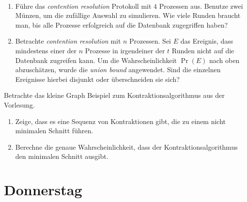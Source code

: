 \documentclass{uebung_cs}
\begin{document}
\begin{aufgabe}\
	\begin{enumerate}
		\item 
		Führe das \textit{contention resolution} Protokoll mit $4$ Prozessen aus. Benutze zwei Münzen, um die zufällige Auswahl zu simulieren. Wie viele Runden braucht man, bis alle Prozesse erfolgreich auf die Datenbank zugegriffen haben?
		\item Betrachte \textit{contention resolution} mit $n$ Prozessen. Sei $E$ das Ereignis, dass mindestens einer der $n$ Prozesse in irgendeiner der $t$ Runden nicht auf die Datenbank zugreifen kann.
		Um die Wahrscheinlichkeit $\Pr(E)$ nach oben abzuschätzen, wurde die \textit{union bound} angewendet. Sind die einzelnen Ereignisse hierbei disjunkt oder überschneiden sie sich?
	\end{enumerate}
\end{aufgabe}    

\begin{aufgabe}[Minimaler Schnitt]
	Betrachte das \glqq kleine Graph\grqq{} Beispiel zum Kontraktionsalgorithmus aus  der Vorlesung.
	\begin{center}
	\end{center}
	\begin{enumerate}
		\item Zeige, dass es eine Sequenz von Kontraktionen gibt, die zu einem nicht minimalen Schnitt führen.
		\item Berechne die genaue Wahrscheinlichkeit, dass der Kontraktionsalgorithmus den minimalen Schnitt ausgibt.
	\end{enumerate}
\end{aufgabe}

\section*{Donnerstag}
\end{document}
